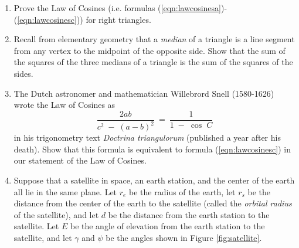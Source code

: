 {\begin{enumerate}[\bfseries 1.]
\begin{displaymath}
 \end{displaymath}
 What do the terms in parentheses represent geometrically? Use your answer to explain why
 $\;\cos\;A ~+~ \cos\;B ~+~ \cos\;C ~>~0\,$ for any triangle, even if one of the cosines is
 negative.\footnote{It turns out that
 $\;1 < \cos\;A ~+~ \cos\;B ~+~ \cos\;C ~\le~3/2\;$ for any triangle, as we will see later.}
 \item\label{exer:lawcosinesright} Prove the Law of Cosines (i.e. formulas
 (\ref{eqn:lawcosinesa})-(\ref{eqn:lawcosinesc})) for right triangles.
 \item Recall from elementary geometry that a \emph{median} of a triangle is a line segment from any
 vertex to the midpoint of the opposite side. Show that the sum of the squares of the three medians
 of a triangle is  the sum of the squares of the sides.
\newpage
 \item The Dutch astronomer and mathematician Willebrord Snell (1580-1626) wrote the Law of Cosines
 as
 \begin{displaymath}
  \frac{2ab}{c^2 \;-\; (a - b)^2} ~=~ \frac{1}{1 \;-\; \cos\;C}
 \end{displaymath}
 in his trigonometry text \emph{Doctrina triangulorum} (published a year after his death). Show that
 this formula is equivalent to formula (\ref{eqn:lawcosinesc}) in our statement of the Law of
 Cosines.
 \item Suppose that a satellite in space, an earth station, and the center of the earth all lie in
 the same plane. Let $r_e$ be the radius of the earth, let $r_s$ be
 the distance from the center of the earth to the satellite (called the \emph{orbital radius} of
 the satellite), and let $d$ be the distance from the
 earth station to the satellite. Let $E$ be the angle of elevation from the earth station to the
 satellite, and let $\gamma$ and $\psi$ be the angles shown in Figure \ref{fig:satellite}.


\end{enumerate}}
